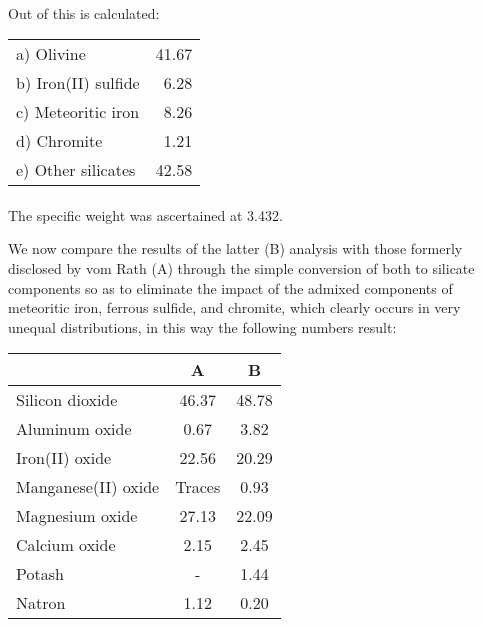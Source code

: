 \documentclass[a4paper, 12pt, oneside]{article}
\begin{document}
\paragraph{}
Out of this is calculated:
\begin{center}
    \begin{tabular}{l r}
        a) Olivine & 41.67\\
        b) Iron(II) sulfide & 6.28\\
        c) Meteoritic iron & 8.26\\
        d) Chromite & 1.21\\
        e) Other silicates & 42.58\\
    \end{tabular}
\end{center}
\paragraph{}
The specific weight was ascertained at 3.432.

We now compare the results of the latter (B) analysis with those formerly disclosed by vom Rath (A) through the simple conversion of both to silicate components so as to eliminate the impact of the admixed components of meteoritic iron, ferrous sulfide, and chromite, which clearly occurs in very unequal distributions, in this way the following numbers result:
\begin{center}
    \begin{tabular}{ |l|c|c| }
        \hline
         & A & B\\\hline
        Silicon dioxide & 46.37 & 48.78\\\hline
        Aluminum oxide & 0.67 & 3.82\\\hline
        Iron(II) oxide & 22.56 & 20.29\\\hline
        Manganese(II) oxide & Traces & 0.93\\\hline
        Magnesium oxide & 27.13 & 22.09\\\hline
        Calcium oxide & 2.15 & 2.45\\\hline
        Potash & - & 1.44\\\hline
        Natron & 1.12 & 0.20\\
        \hline
    \end{tabular}
\end{center}
\end{document}
